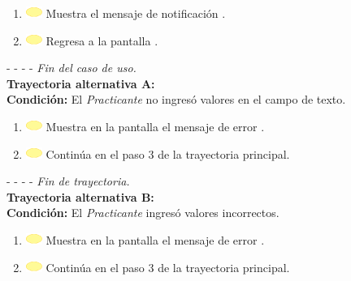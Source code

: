 \begin{enumerate}
	\item \includegraphics[width=15pt]{./Figuras/iconosCU/herramienta.png} Muestra el mensaje de notificación .
	\item \includegraphics[width=15pt]{./Figuras/iconosCU/herramienta.png} Regresa a la pantalla .
\end{enumerate}
	
- - - - \textit{Fin del caso de uso.} \\

\textbf{\large{Trayectoria alternativa A:}}\\
\textbf{Condición: } El \textit{Practicante} no ingresó valores en el campo de texto.

\begin{enumerate}
	\item \includegraphics[width=15pt]{./Figuras/iconosCU/herramienta.png} Muestra en la pantalla  el mensaje de error .
	\item \includegraphics[width=15pt]{./Figuras/iconosCU/herramienta.png} Continúa en el paso 3 de la trayectoria principal.
\end{enumerate}


- - - - \textit{Fin de trayectoria.} \\

\textbf{\large{Trayectoria alternativa B:}} \\
\textbf{Condición: } El \textit{Practicante} ingresó valores incorrectos.

\begin{enumerate}
	\item \includegraphics[width=15pt]{./Figuras/iconosCU/herramienta.png} Muestra en la pantalla  el mensaje de error . 
	\item \includegraphics[width=15pt]{./Figuras/iconosCU/herramienta.png} Continúa en el paso 3 de la trayectoria principal.
\end{enumerate}

